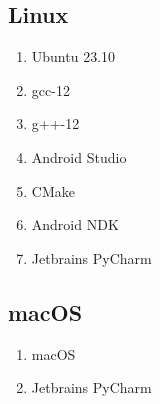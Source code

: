 \subsection{Linux}

\begin{enumerate}
	\item Ubuntu 23.10
	\item gcc-12
	\item g++-12
	\item Android Studio
	\item CMake
	\item Android NDK
	\item Jetbrains PyCharm
\end{enumerate}

\subsection{macOS}

\begin{enumerate}
	\item macOS
	\item Jetbrains PyCharm
\end{enumerate}
